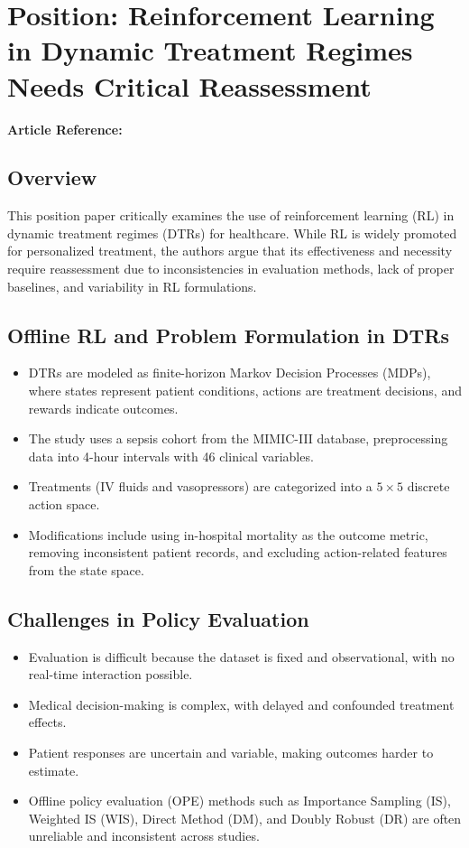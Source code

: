 \section{Position: Reinforcement Learning in Dynamic Treatment Regimes Needs Critical Reassessment}
\textbf{Article Reference:} \cite{luoReinforcementLearningDynamic2024}

\subsection*{Overview}
This position paper critically examines the use of reinforcement learning (RL) in dynamic treatment regimes (DTRs) for healthcare. While RL is widely promoted for personalized treatment, the authors argue that its effectiveness and necessity require reassessment due to inconsistencies in evaluation methods, lack of proper baselines, and variability in RL formulations.

\subsection*{Offline RL and Problem Formulation in DTRs}
\begin{itemize}
    \item DTRs are modeled as finite-horizon Markov Decision Processes (MDPs), where states represent patient conditions, actions are treatment decisions, and rewards indicate outcomes.
    \item The study uses a sepsis cohort from the MIMIC-III database, preprocessing data into 4-hour intervals with 46 clinical variables.
    \item Treatments (IV fluids and vasopressors) are categorized into a $5 \times 5$ discrete action space.
    \item Modifications include using in-hospital mortality as the outcome metric, removing inconsistent patient records, and excluding action-related features from the state space.
\end{itemize}

\subsection*{Challenges in Policy Evaluation}
\begin{itemize}
    \item Evaluation is difficult because the dataset is fixed and observational, with no real-time interaction possible.
    \item Medical decision-making is complex, with delayed and confounded treatment effects.
    \item Patient responses are uncertain and variable, making outcomes harder to estimate.
    \item Offline policy evaluation (OPE) methods such as Importance Sampling (IS), Weighted IS (WIS), Direct Method (DM), and Doubly Robust (DR) are often unreliable and inconsistent across studies.
\end{itemize}

